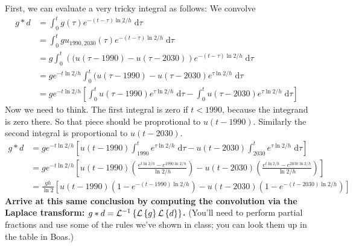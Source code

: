 \documentclass[answers]{exam}\newcommand{\repositoryInformationSetup}{     \usepackage[dvipsnames]{xcolor}     \usepackage[ angle=90, color=black, opacity=1, scale=2, ]{background}      \SetBgPosition{current page.west}      \SetBgVshift{-4.5mm}      \backgroundsetup{contents={{\color{green}\texttt{-{}-} differs from commit \texttt{40a9b87} in 0 files}}} } \newcommand{\commit}{{{\color{green}40a9b87}}}\usepackage{amsmath}
\newcommand{\laplace}[1]{\ensuremath{\mathcal{L}\left\{#1\right\}}\xspace}
\newcommand{\inverselaplace}[1]{\ensuremath{\mathcal{L}\inverse\left\{#1\right\}}\xspace}
\providecommand{\id}{}
\renewcommand{\id}[1]{\ensuremath{\; \mathrm{d}#1}}
\begin{document}
\begin{questions}
First, we can evaluate a very tricky integral as follows:
We convolve
\begin{align*}
	g*d 
		&=	\int_{0}^{t} g(\tau) e^{-(t-\tau) \ln 2/h} \id{\tau}
	\\	&=	\int_{0}^{t} g u_{1990,2030}(\tau) e^{-(t-\tau) \ln 2/h} \id{\tau}
	\\	&=	g \int_{0}^{t} \left((u(\tau-1990) - u(\tau-2030)\right) e^{-(t-\tau) \ln 2/h} \id{\tau}
	\\	&=	g e^{-t \ln 2/h} \int_{0}^{t} (u(\tau-1990) - u(\tau-2030) e^{\tau \ln 2/h} \id{\tau}
	\\	&=	g e^{-t \ln 2/h} \left[\int_{0}^{t} u(\tau-1990) e^{\tau \ln 2/h} \id{\tau} - \int_{0}^{t} u(\tau-2030) e^{\tau \ln 2/h} \id{\tau}\right]
\end{align*}
Now we need to think.  The first integral is zero if $t<1990$, because the integrand is zero there.  So that piece should be proprotional to $u(t-1990)$.
Similarly the second integral is proportional to $u(t-2030)$.
\begin{align*}
	g*d
		&=	g e^{-t \ln 2/h} \left[ u(t-1990)\int_{1990}^t e^{\tau \ln 2/h} \id{\tau} - u(t-2030)\int_{2030}^{t} e^{\tau \ln 2/h} \id{\tau}\right]
	\\	&=	g e^{-t \ln 2/h} \left[ u(t-1990) \left(\frac{e^{t \ln2/h}-e^{1990 \ln 2/h}}{\ln 2/h}\right) - u(t-2030) \left(\frac{e^{t \ln 2/h} - e^{2030 \ln 2/h}}{\ln 2 / h}\right)\right]
	\\	&=	\frac{gh}{\ln 2} \left[u(t-1990)\left(1-e^{-(t-1990) \ln 2/h} \right)- u(t-2030)\left(1-e^{-(t-2030) \ln 2 / h}\right)\right]
\end{align*}
{\bf Arrive at this same conclusion by computing the convolution via the Laplace transform: $g*d = \inverselaplace{\laplace{g} \laplace{d}}$.} (You'll need to perform partial fractions and use some of the rules we've shown in class; you can look them up in the table in Boas.)
\begin{solution}\end{solution}


\end{questions}
\end{document}
